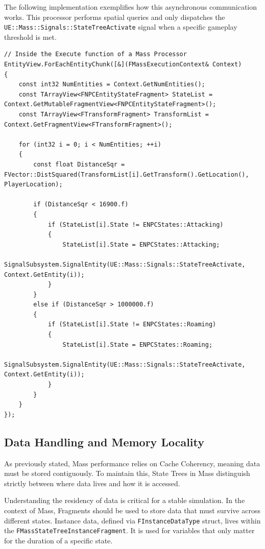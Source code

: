 The following implementation exemplifies how this asynchronous communication works. This processor performs spatial queries and only dispatches the \texttt{UE::Mass::Signals::StateTreeActivate} signal when a specific gameplay threshold is met. 

\begin{lstlisting}
// Inside the Execute function of a Mass Processor
EntityView.ForEachEntityChunk([&](FMassExecutionContext& Context)
{
    const int32 NumEntities = Context.GetNumEntities();
    const TArrayView<FNPCEntityStateFragment> StateList = Context.GetMutableFragmentView<FNPCEntityStateFragment>();
    const TArrayView<FTransformFragment> TransformList = Context.GetFragmentView<FTransformFragment>();

    for (int32 i = 0; i < NumEntities; ++i)
    {
        const float DistanceSqr = FVector::DistSquared(TransformList[i].GetTransform().GetLocation(), PlayerLocation);

        if (DistanceSqr < 16900.f) 
        {
            if (StateList[i].State != ENPCStates::Attacking)
            {
                StateList[i].State = ENPCStates::Attacking;
                SignalSubsystem.SignalEntity(UE::Mass::Signals::StateTreeActivate, Context.GetEntity(i));
            }
        }
        else if (DistanceSqr > 1000000.f) 
        {
            if (StateList[i].State != ENPCStates::Roaming)
            {
                StateList[i].State = ENPCStates::Roaming;
                SignalSubsystem.SignalEntity(UE::Mass::Signals::StateTreeActivate, Context.GetEntity(i));
            }
        }
    }
});
\end{lstlisting}

\subsection{Data Handling and Memory Locality}

As previously stated, Mass performance relies on Cache Coherency, meaning data must be stored contiguously. To maintain this, State Trees in Mass distinguish strictly between where data lives and how it is accessed.

Understanding the residency of data is critical for a stable simulation. In the context of Mass, Fragments should be used to store data that must survive across different states. Instance data, defined via \texttt{FInstanceDataType} struct, lives within the \texttt{FMassStateTreeInstanceFragment}. It is used for variables that only matter for the duration of a specific state.

